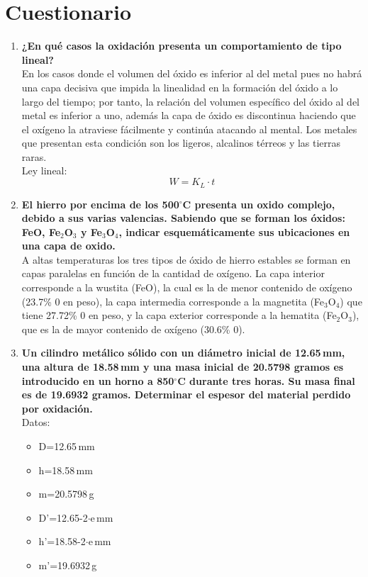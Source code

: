 \documentclass[a4paper,12pt]{report}
\begin{document}
\section*{Cuestionario}
\begin{enumerate}
\item \textbf{¿En qué casos la oxidación presenta un comportamiento de tipo lineal?} \\
En los casos donde el volumen del óxido es inferior al del metal pues no habrá una capa decisiva que impida la linealidad en la formación del óxido a lo largo del tiempo; por tanto, la relación del volumen específico del óxido al del metal es inferior a uno, además la capa de óxido es discontinua haciendo que el oxígeno la atraviese fácilmente y continúa atacando al mental. Los metales que presentan esta condición son los ligeros, alcalinos térreos y las tierras raras.\\
Ley lineal:
$$
W = K_{L}\cdot t
$$
\item \textbf{El hierro por encima de los 500$^{\circ}$C presenta un oxido complejo, debido a sus varias valencias. Sabiendo que se forman los óxidos: FeO, Fe$_{2}$O$_{3}$ y Fe$_{3}$O$_{4}$, indicar esquemáticamente sus ubicaciones en una capa de oxido.}\\
A altas temperaturas los tres tipos de óxido de hierro estables se forman en capas paralelas en función de la cantidad de oxígeno. La capa interior corresponde a la wustita (FeO), la cual es la de menor contenido de oxígeno (23.7\% 0 en peso), la capa intermedia corresponde a la magnetita (Fe$_{3}$O$_{4}$) que tiene 27.72\% 0 en peso, y la capa exterior corresponde a la hematita (Fe$_{2}$O$_{3}$), que es la de mayor contenido de oxígeno (30.6\% 0).
\item \textbf{Un cilindro metálico sólido con un diámetro inicial de 12.65$\,$mm, una altura de 18.58$\,$mm y una masa inicial de 20.5798 gramos es introducido en un horno a 850$^{\circ}$C durante tres horas. Su masa final es de 19.6932 gramos. Determinar el espesor del material perdido por oxidación.}\\
Datos:
\begin{itemize}
\item D=12.65$\,$mm
\item h=18.58$\,$mm
\item m=20.5798$\,$g
\item D'=12.65-2$\cdot$e$\,$mm
\item h'=18.58-2$\cdot$e$\,$mm
\item m'=19.6932$\,$g
\end{itemize}

\end{enumerate}
\end{document}
